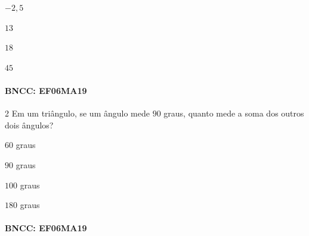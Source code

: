 \begin{escolha}
\item $-2,5$
\item $13$
\item $18$
\item $45$
\end{escolha}

\paragraph{BNCC: EF06MA19}


\num{2}  Em um triângulo, se um ângulo mede $90$ graus, quanto mede a soma dos
outros dois ângulos?

\begin{escolha}
\item $60$ graus
\item $90$ graus
\item $100$ graus
\item $180$ graus
\end{escolha}

\paragraph{BNCC: EF06MA19 }


